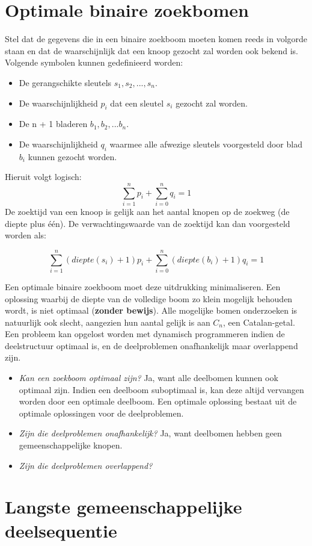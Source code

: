 \documentclass{report}
\begin{document}
	\section{Optimale binaire zoekbomen}
	Stel dat de gegevens die in een binaire zoekboom moeten komen reeds in volgorde staan en dat de waarschijnlijk dat een knoop gezocht zal worden ook bekend is. Volgende symbolen kunnen gedefinieerd worden:
	\begin{itemize}
		\item De gerangschikte sleutels $s_1, s_2, ..., s_n$.
		\item De waarschijnlijkheid $p_i$ dat een sleutel $s_i$ gezocht zal worden.
		\item De n + 1 bladeren $b_1, b_2, ... b_n$.
		\item De waarschijnlijkheid $q_i$ waarmee alle afwezige sleutels voorgesteld door blad $b_i$ kunnen gezocht worden.
	\end{itemize}
	Hieruit volgt logisch:
	$$\sum_{i = 1}^n p_i + \sum_{i = 0}^{n} q_i = 1$$
	De zoektijd van een knoop is gelijk aan het aantal knopen op de zoekweg (de diepte plus één). De verwachtingswaarde van de zoektijd kan dan voorgesteld worden als:
	
	$$\sum_{i = 1}^n (diepte(s_i) + 1)p_i + \sum_{i = 0}^{n} (diepte(b_i) + 1)q_i = 1$$
	
	Een optimale binaire zoekboom moet deze uitdrukking minimaliseren. Een oplossing waarbij de diepte van de volledige boom zo klein mogelijk behouden wordt, is niet optimaal (\textbf{zonder bewijs}). Alle mogelijke bomen onderzoeken is natuurlijk ook slecht, aangezien hun aantal gelijk is aan $C_n$, een Catalan-getal. Een probleem kan opgelost worden met dynamisch programmeren indien de deelstructuur optimaal is, en de deelproblemen onafhankelijk maar overlappend zijn.
	\begin{itemize}
		\item \textit{Kan een zoekboom optimaal zijn?} Ja, want alle deelbomen kunnen ook optimaal zijn. Indien een deelboom suboptimaal is, kan deze altijd vervangen worden door een optimale deelboom. Een optimale oplossing bestaat uit de optimale oplossingen voor de deelproblemen.
		
		\item \textit{Zijn die deelproblemen onafhankelijk?} Ja, want deelbomen hebben geen gemeenschappelijke knopen.
		
		\item \textit{Zijn die deelproblemen overlappend?} 
	\end{itemize}
	\section{Langste gemeenschappelijke deelsequentie}
	
\end{document}
